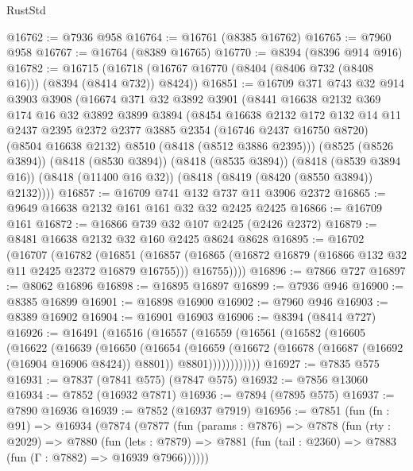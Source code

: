 \begin{lexlean}{RustStd}
\begin{coremodule}
@16762 := @7936 @958
@16764 := @16761 (@8385 @16762)
@16765 := @7960 @958
@16767 := @16764 (@8389 @16765)
@16770 := @8394 (@8396 @914 @916)
@16782 := @16715
    (@16718 (@16767 @16770 (@8404 (@8406 @732 (@8408 @16))) (@8394 (@8414 @732)) @8424))
@16851 := @16709
    @371
    @743
    @32
    @914
    @3903
    @3908
    (@16674
      @371
      @32
      @3892
      @3901
      (@8441
        @16638
        @2132
        @369
        @174
        @16
        @32
        @3892
        @3899
        @3894
        (@8454
          @16638
          @2132
          @172
          @132
          @14
          @11
          @2437
          @2395
          @2372
          @2377
          @3885
          @2354
          (@16746 @2437 @16750 @8720)
          (@8504 @16638 @2132)
          @8510
          (@8418 (@8512 @3886 @2395)))
        (@8525 (@8526 @3894))
        (@8418 (@8530 @3894))
        (@8418 (@8535 @3894))
        (@8418 (@8539 @3894 @16))
        (@8418 (@11400 @16 @32))
        (@8418 (@8419 (@8420 (@8550 @3894)) @2132))))
@16857 := @16709 @741 @132 @737 @11 @3906 @2372
@16865 := @9649 @16638 @2132 @161 @161 @32 @32 @2425 @2425
@16866 := @16709 @161
@16872 := @16866 @739 @32 @107 @2425 (@2426 @2372)
@16879 := @8481 @16638 @2132 @32 @160 @2425 @8624 @8628
@16895 := @16702
    (@16707
      (@16782
        (@16851
          (@16857
            (@16865 (@16872 @16879 (@16866 @132 @32 @11 @2425 @2372 @16879 @16755)))
            @16755))))
@16896 := @7866 @727
@16897 := @8062 @16896
@16898 := @16895 @16897
@16899 := @7936 @946
@16900 := @8385 @16899
@16901 := @16898 @16900
@16902 := @7960 @946
@16903 := @8389 @16902
@16904 := @16901 @16903
@16906 := @8394 (@8414 @727)
@16926 := @16491
    (@16516
      (@16557
        (@16559
          (@16561
            (@16582
              (@16605
                (@16622
                  (@16639
                    (@16650
                      (@16654
                        (@16659
                          (@16672
                            (@16678 (@16687 (@16692 (@16904 @16906 @8424)) @8801))
                            @8801))))))))))))
@16927 := @7835 @575
@16931 := @7837 (@7841 @575) (@7847 @575)
@16932 := @7856 @13060
@16934 := @7852 (@16932 @7871)
@16936 := @7894 (@7895 @575)
@16937 := @7890 @16936
@16939 := @7852 (@16937 @7919)
@16956 := @7851
    (fun (fn : @91) =>
    @16934
      (@7874
        (@7877
          (fun (params : @7876) =>
          @7878
            (fun (rty : @2029) =>
            @7880
              (fun (lets : @7879) =>
              @7881 (fun (tail : @2360) => @7883 (fun (Γ : @7882) => @16939 @7966))))))

\end{coremodule}
\end{lexlean}
